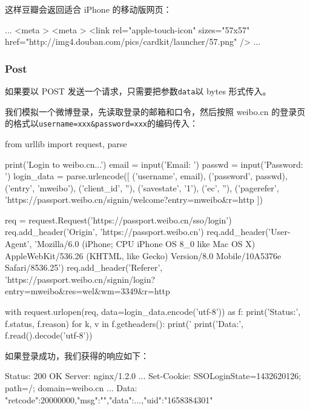 这样豆瓣会返回适合 iPhone 的移动版网页：

\begin{pythoncode}
...
    <meta >
    <meta >
    <link rel="apple-touch-icon" sizes="57x57" href="http://img4.douban.com/pics/cardkit/launcher/57.png" />
...
\end{pythoncode}

\hypertarget{post}{%
\subsubsection{Post}\label{post}}

如果要以 POST 发送一个请求，只需要把参数\texttt{data}以 bytes 形式传入。

我们模拟一个微博登录，先读取登录的邮箱和口令，然后按照 weibo.cn
的登录页的格式以\texttt{username=xxx\&password=xxx}的编码传入：

\begin{pythoncode}
from urllib import request, parse

print('Login to weibo.cn...')
email = input('Email: ')
passwd = input('Password: ')
login_data = parse.urlencode([
    ('username', email),
    ('password', passwd),
    ('entry', 'mweibo'),
    ('client_id', ''),
    ('savestate', '1'),
    ('ec', ''),
    ('pagerefer', 'https://passport.weibo.cn/signin/welcome?entry=mweibo&r=http%
])

req = request.Request('https://passport.weibo.cn/sso/login')
req.add_header('Origin', 'https://passport.weibo.cn')
req.add_header('User-Agent', 'Mozilla/6.0 (iPhone; CPU iPhone OS 8_0 like Mac OS X) AppleWebKit/536.26 (KHTML, like Gecko) Version/8.0 Mobile/10A5376e Safari/8536.25')
req.add_header('Referer', 'https://passport.weibo.cn/signin/login?entry=mweibo&res=wel&wm=3349&r=http%

with request.urlopen(req, data=login_data.encode('utf-8')) as f:
    print('Status:', f.status, f.reason)
    for k, v in f.getheaders():
        print('%
    print('Data:', f.read().decode('utf-8'))
\end{pythoncode}

如果登录成功，我们获得的响应如下：

\begin{pythoncode}
Status: 200 OK
Server: nginx/1.2.0
...
Set-Cookie: SSOLoginState=1432620126; path=/; domain=weibo.cn
...
Data: {"retcode":20000000,"msg":"","data":{...,"uid":"1658384301"}}
\end{pythoncode}

